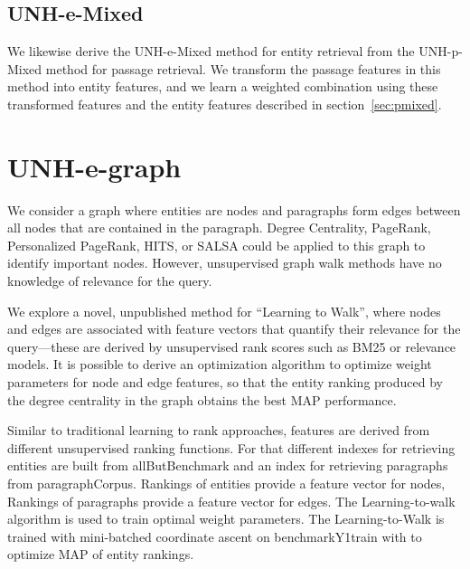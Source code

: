 \documentclass{article}
\begin{document}
\subsection{UNH-e-Mixed}

We likewise derive the UNH-e-Mixed method for entity retrieval from the UNH-p-Mixed method for passage retrieval.
We transform the passage features in this method into entity features, and we learn a weighted combination using these transformed features and the entity features described in section~\ref{sec:pmixed}.



\section{UNH-e-graph}

We consider a graph where entities are nodes and paragraphs form edges between all nodes that are contained in the paragraph. Degree Centrality, PageRank, Personalized PageRank, HITS, or SALSA could be applied to this graph to identify important nodes. However, unsupervised graph walk methods have no knowledge of relevance for the query. 

We explore a novel, unpublished method for ``Learning to Walk'', where nodes and edges are associated with feature vectors that quantify their relevance for the query---these are derived by unsupervised rank scores such as BM25 or relevance models. It is possible to derive an optimization algorithm to optimize weight parameters for node and edge features, so that the entity ranking produced by the degree centrality in the graph obtains the best MAP performance.

Similar to traditional learning to rank approaches, features are derived from different unsupervised ranking functions. 
For that different indexes for retrieving entities  are built from allButBenchmark and an index for retrieving paragraphs from  paragraphCorpus. Rankings of entities provide a feature vector for nodes, Rankings of paragraphs provide a feature vector for edges.  The Learning-to-walk algorithm is used to train optimal weight parameters. The Learning-to-Walk is trained with mini-batched coordinate ascent on benchmarkY1train with to optimize MAP of entity rankings.
\end{document}
